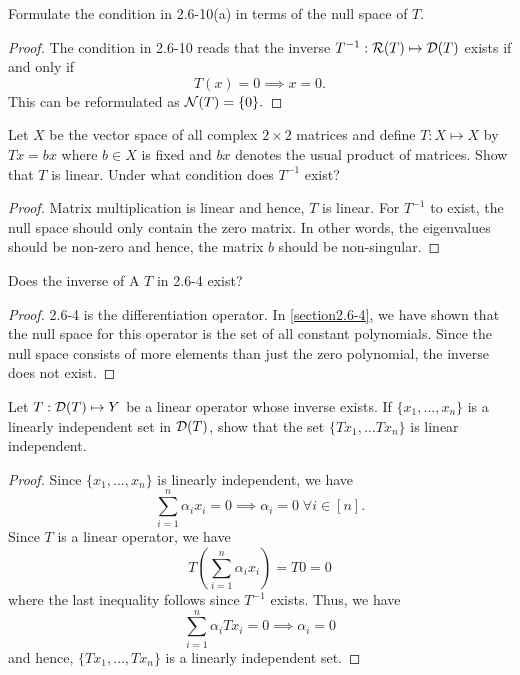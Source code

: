   \begin{question}
      Formulate the condition in 2.6-10(a) in terms of the null space of $T$.
      \label{section2.6-10}
  \end{question}
  \begin{proof}
      The condition in 2.6-10 reads that the inverse $T^{-1} : \mathcal{R}(T) \mapsto \mathcal{D}(T)$ exists if and only if 
      \[T(x) = 0 \implies x = 0.\]
      This can be reformulated as $\mathcal{N}(T) = \{0\}.$
  \end{proof}

  \begin{question}
    Let $X$ be the vector space of all complex $2 \times 2$  matrices and define $T : X \mapsto X$ by $Tx = bx$ where $b \in X$ is fixed and $bx$ denotes the usual product of matrices. Show that $T$ is linear. Under what condition does $T^{-1}$ exist?
    \label{section2.6-11}
  \end{question}
  \begin{proof}
    Matrix multiplication is linear and hence, $T$ is linear. For $T^{-1}$ to exist, the null space should only contain the zero matrix. In other words, the eigenvalues should be non-zero and hence, the matrix $b$ should be non-singular.
  \end{proof}

  \begin{question}
      Does the inverse of A $T$ in 2.6-4 exist?
      \label{section2.6-12}
 \end{question}
 \begin{proof}
     2.6-4 is the differentiation operator. In \ref{section2.6-4}, we have shown that the null space for this operator is the set of all constant polynomials. Since the null space consists of more elements than just the zero polynomial, the inverse does not exist.
 \end{proof}

 \begin{question}
     Let $T : \mathcal{D}(T) \mapsto Y$ be a linear operator whose inverse exists. If $\{x_1 , \ldots , x_n\}$ is a linearly independent set in $\mathcal{D}(T)$, show that the set $\{Tx_1 , \ldots Tx_n\}$ is linear independent.
     \label{section2.6-13}
 \end{question}
 \begin{proof}
     Since $\{x_1 , \ldots , x_n\}$ is linearly independent, we have
\[\sum_{i=1}^n{\alpha_i x_i} = 0 \implies \alpha_i = 0 \;\forall i \in [n].\]
Since $T$ is a linear operator, we have
\[T\left(\sum_{i=1}^n{\alpha_i x_i}\right) = T0 = 0\]
where the last inequality follows since $T^{-1}$ exists. Thus, we have
\[\sum_{i=1}^n \alpha_i Tx_i = 0 \implies \alpha_i= 0\]
and hence, $\{Tx_1 , \ldots , Tx_n\}$ is a linearly independent set.
 \end{proof}

